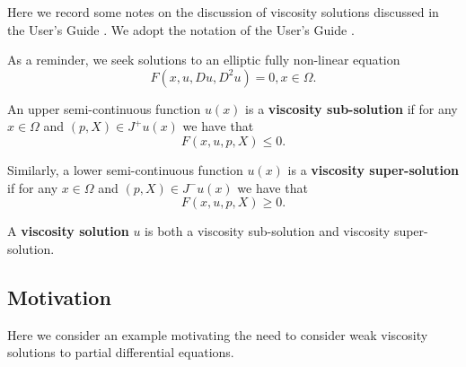 Here we record some notes on the discussion of viscosity solutions discussed in the User's Guide \cite{usersguide}. We adopt the notation of the User's Guide \cite{usersguide}.

As a reminder, we seek solutions to an elliptic fully non-linear equation
\begin{equation}
F(x,u, Du, D^2 u) = 0, x\in \Omega.
\end{equation}

An upper semi-continuous function $u(x)$ is a \textbf{viscosity sub-solution} if for any $x\in\Omega$ and $(p,X)\in J^+u(x)$ we have that
\begin{equation}
F(x,u, p, X) \leq 0.
\end{equation}

Similarly, a lower semi-continuous function $u(x)$ is a \textbf{viscosity super-solution} if for any $x\in\Omega$ and $(p,X)\in J^-u(x)$ we have that
\begin{equation}
F(x,u,p,X) \geq 0.
\end{equation}

A \textbf{viscosity solution} $u$ is both a viscosity sub-solution and viscosity super-solution.


\subsection{Motivation}

Here we consider an example motivating the need to consider weak viscosity solutions to partial differential equations.

